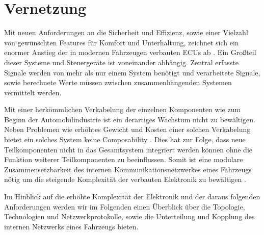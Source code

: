 
\section{Vernetzung}
Mit neuen Anforderungen an die Sicherheit und Effizienz, sowie einer Vielzahl von gewünschten Features 
für Komfort und Unterhaltung, zeichnet sich ein enormer Anstieg der in modernen Fahrzeugen verbauten ECUs ab \cite{TW_kim2014gateway}.
Ein Großteil dieser Systeme und Steuergeräte ist voneinander abhängig. Zentral erfasste Signale werden von mehr als nur einem
System benötigt und verarbeitete Signale, sowie berechnete Werte müssen zwischen zusammenhängenden Systemen vermittelt werden.

Mit einer herkömmlichen Verkabelung der einzelnen Komponenten wie zum Beginn der Automobilindustrie ist ein derartiges Wachstum
nicht zu bewältigen. Neben Problemen wie erhöhtes Gewicht und Kosten einer solchen Verkabelung bietet ein solches System keine
Composability \cite{reif2011bosch}. Dies hat zur Folge, dass neue Teilkomponenten nicht in das Gesamtsystem integriert werden können ohne die Funktion 
weiterer Teilkomponenten zu beeinflussen. Somit ist eine modulare Zusammensetzbarkeit des internen Kommunikationsnetzwerkes eines Fahrzeugs nötig um die 
steigende Komplexität der verbauten Elektronik zu bewältigen \cite{reif2011bosch}.

Im Hinblick auf die erhöhte Komplexität der Elektronik und der daraus folgenden Anforderungen werden wir im Folgenden
einen Überblick über die Topologie, Technologien und Netzwerkprotokolle, sowie die Unterteilung und Kopplung des internen Netzwerks eines Fahrzeugs bieten.

